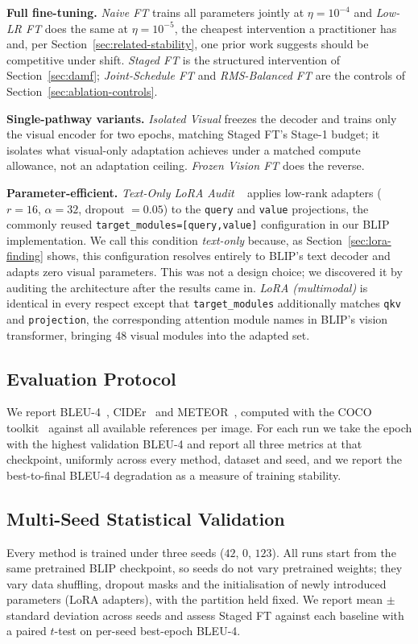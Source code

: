 \documentclass[journal]{IEEEtran}
\begin{document}
\textbf{Full fine-tuning.} \emph{Naive FT} trains all parameters
jointly at $\eta = 10^{-4}$ and \emph{Low-LR FT} does the same at
$\eta = 10^{-5}$, the cheapest intervention a practitioner has and,
per Section~\ref{sec:related-stability}, one prior work suggests
should be competitive under shift. \emph{Staged FT} is the structured
intervention of Section~\ref{sec:damf}; \emph{Joint-Schedule FT} and
\emph{RMS-Balanced FT} are the controls of
Section~\ref{sec:ablation-controls}.

\textbf{Single-pathway variants.} \emph{Isolated Visual} freezes the
decoder and trains only the visual encoder for two epochs, matching
Staged FT's Stage-1 budget; it isolates what visual-only adaptation
achieves under a matched compute allowance, not an adaptation ceiling.
\emph{Frozen Vision FT} does the reverse.

\textbf{Parameter-efficient.} \emph{Text-Only LoRA Audit}
~\cite{hu2022lora} applies low-rank adapters ($r=16$,
$\alpha=32$, dropout $=0.05$) to the \texttt{query} and
\texttt{value} projections, the commonly reused
\texttt{target\_modules=[query,value]} configuration in our BLIP
implementation. We call this condition \emph{text-only} because,
as Section~\ref{sec:lora-finding} shows, this configuration
resolves entirely to BLIP's text decoder and
adapts zero visual parameters. This was not a design choice; we
discovered it by auditing the architecture after the results came
in. \emph{LoRA (multimodal)} is identical in every respect except
that \texttt{target\_modules} additionally matches
\texttt{qkv} and \texttt{projection}, the corresponding attention
module names in BLIP's vision transformer, bringing 48 visual
modules into the adapted set.

\subsection{Evaluation Protocol}
We report BLEU-4~\cite{papineni2002bleu},
CIDEr~\cite{vedantam2015cider} and
METEOR~\cite{banerjee2005meteor}, computed with the COCO
toolkit~\cite{chen2015cococaptions} against all available references
per image. For each run we take the epoch with the highest validation
BLEU-4 and report all three metrics at that checkpoint, uniformly
across every method, dataset and seed, and we report the best-to-final
BLEU-4 degradation as a measure of training stability.

\subsection{Multi-Seed Statistical Validation}
Every method is trained under three seeds ($42$, $0$, $123$). All runs
start from the same pretrained BLIP checkpoint, so seeds do not vary
pretrained weights; they vary data shuffling, dropout masks and the
initialisation of newly introduced parameters (LoRA adapters), with
the partition held fixed. We report mean $\pm$ standard deviation
across seeds and assess Staged FT against each baseline with a paired
$t$-test on per-seed best-epoch BLEU-4.
\end{document}
